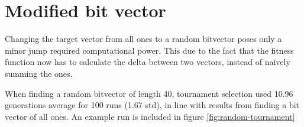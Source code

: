 \section{Modified bit vector}
\label{sec:modified-vector}

Changing the target vector from all ones to a random bitvector poses only a minor jump required computational power. This due to the fact that the fitness function now has to calculate the delta between two vectors, instead of naively summing the ones. 

When finding a random bitvector of length 40, tournament selection used 10.96 generations average for 100 runs (1.67 std), in line with results from finding a bit vector of all ones. An example run is included in figure \ref{fig:random-tournament}
